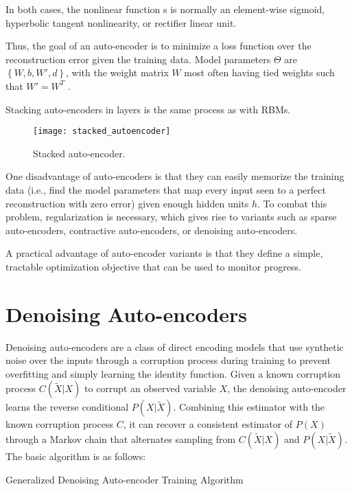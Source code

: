 In both cases, the nonlinear function s is normally an element-wise sigmoid, hyperbolic tangent nonlinearity, or rectifier linear unit.

Thus, the goal of an auto-encoder is to minimize a loss function over the reconstruction error given the training data. Model parameters \(\Theta\) are \(\left\{W,b,W',d\right\}\), with the weight matrix \(W\) most often having tied weights such that \(W' = W^T\) .

Stacking auto-encoders in layers is the same process as with RBMs.
\begin{figure}[h!]
  \centering
    \texttt{[image: stacked\_autoencoder]}
\caption{Stacked auto-encoder.}
\end{figure}

One disadvantage of auto-encoders is that they can easily memorize the training data (i.e., find the model parameters that map every input seen to a perfect reconstruction with zero error) given enough hidden units \(h\). To combat this problem, regularization is necessary, which gives rise to variants such as sparse auto-encoders, contractive auto-encoders, or denoising auto-encoders.

A practical advantage of auto-encoder variants is that they define a simple, tractable optimization objective that can be used to monitor progress.

\section{Denoising Auto-encoders}
Denoising auto-encoders \cite{bengio13a, vincent08, alain12} are a class of direct encoding models that use synthetic noise over the inputs through a corruption process during training to prevent overfitting and simply learning the identity function. Given a known corruption process \(C(\widetilde{X}|X)\) to corrupt an observed variable \(X\), the denoising auto-encoder learns the reverse conditional \(P(X|\widetilde{X})\). Combining this estimator with the known corruption process \(C\), it can recover a consistent estimator of \(P(X)\) through a Markov chain that alternates sampling from \(C(\widetilde{X}|X)\) and \(P(X|\widetilde{X})\). The basic algorithm is as follows:

\begin{algorithm}[h!]
	\caption{ Generalized Denoising Auto-encoder Training Algorithm }
\end{algorithm}


